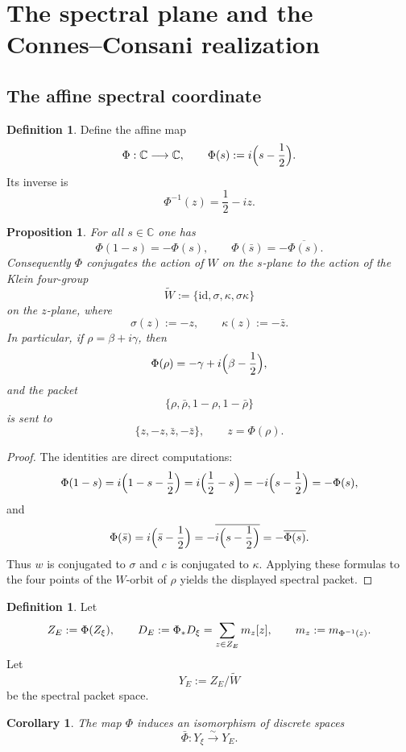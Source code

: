 \documentclass[11pt,a4paper]{article}
\newtheorem{proposition}[theorem]{Proposition}
\newtheorem{corollary}[theorem]{Corollary}
\theoremstyle{definition}
\newtheorem{definition}[theorem]{Definition}
\theoremstyle{remark}
\newcommand{\CC}{\mathbb C}
\begin{document}
\section{The spectral plane and the Connes--Consani realization}

\subsection{The affine spectral coordinate}

\begin{definition}
Define the affine map
\[
\Phi:\CC\longrightarrow\CC,
\qquad
\Phi(s):=i\Bigl(s-\frac12\Bigr).
\]
Its inverse is
\[
\Phi^{-1}(z)=\frac12-iz.
\]
\end{definition}

\begin{proposition}\label{prop:Phi-symmetry}
For all $s\in\CC$ one has
\[
\Phi(1-s)=-\Phi(s),
\qquad
\Phi(\bar s)=-\overline{\Phi(s)}.
\]
Consequently $\Phi$ conjugates the action of $W$ on the $s$-plane to the action of the Klein four-group
\[
\widetilde W:=\{\mathrm{id},\sigma,\kappa,\sigma\kappa\}
\]
on the $z$-plane, where
\[
\sigma(z):=-z,
\qquad
\kappa(z):=-\bar z.
\]
In particular, if $\rho=\beta+i\gamma$, then
\[
\Phi(\rho)=-\gamma+i\Bigl(\beta-\frac12\Bigr),
\]
and the packet
\[
\{\rho,\bar\rho,1-\rho,1-\bar\rho\}
\]
is sent to
\[
\{z,-z,\bar z,-\bar z\},
\qquad z=\Phi(\rho).
\]
\end{proposition}

\begin{proof}
The identities are direct computations:
\[
\Phi(1-s)=i\Bigl(1-s-\frac12\Bigr)=i\Bigl(\frac12-s\Bigr)=-i\Bigl(s-\frac12\Bigr)=-\Phi(s),
\]
and
\[
\Phi(\bar s)=i\Bigl(\bar s-\frac12\Bigr)=-\overline{i\Bigl(s-\frac12\Bigr)}=-\overline{\Phi(s)}.
\]
Thus $w$ is conjugated to $\sigma$ and $c$ is conjugated to $\kappa$.  Applying these formulas to the four points of the $W$-orbit of $\rho$ yields the displayed spectral packet.
\end{proof}

\begin{definition}
Let
\[
Z_E:=\Phi(Z_\xi),
\qquad
D_E:=\Phi_*D_\xi=\sum_{z\in Z_E} m_z[z],
\\\qquad m_z:=m_{\Phi^{-1}(z)}.
\]
Let
\[
Y_E:=Z_E/\widetilde W
\]
be the spectral packet space.
\end{definition}

\begin{corollary}\label{cor:packet-space-iso}
The map $\Phi$ induces an isomorphism of discrete spaces
\[
\bar\Phi:Y_\xi\stackrel{\sim}{\longrightarrow} Y_E.
\]
\end{corollary}
\end{document}
